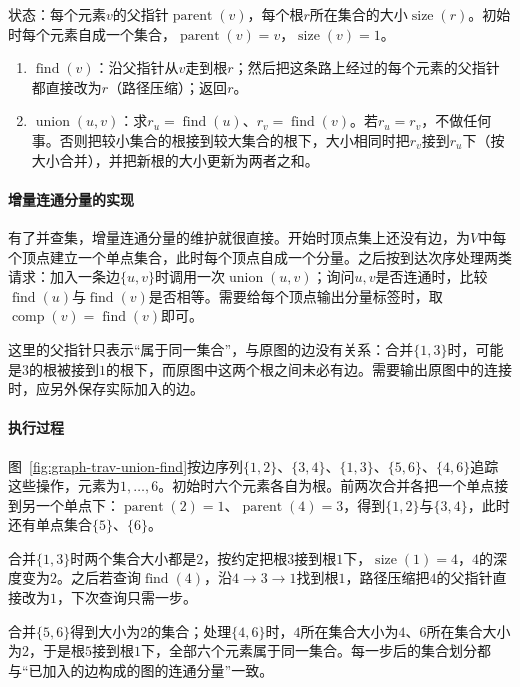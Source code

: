 \begin{algorithm}[并查集的两种操作]
\label{alg:graph-trav-union-find}
状态：每个元素$v$的父指针$\operatorname{parent}(v)$，每个根$r$所在集合的大小$\operatorname{size}(r)$。初始时每个元素自成一个集合，$\operatorname{parent}(v)=v$，$\operatorname{size}(v)=1$。
\begin{enumerate}
  \item $\operatorname{find}(v)$：沿父指针从$v$走到根$r$；然后把这条路上经过的每个元素的父指针都直接改为$r$（路径压缩）；返回$r$。
  \item $\operatorname{union}(u,v)$：求$r_u=\operatorname{find}(u)$、$r_v=\operatorname{find}(v)$。若$r_u=r_v$，不做任何事。否则把较小集合的根接到较大集合的根下，大小相同时把$r_v$接到$r_u$下（按大小合并），并把新根的大小更新为两者之和。
\end{enumerate}
\end{algorithm}

\paragraph{增量连通分量的实现}
有了并查集，增量连通分量的维护就很直接。开始时顶点集上还没有边，为$V$中每个顶点建立一个单点集合，此时每个顶点自成一个分量。之后按到达次序处理两类请求：加入一条边$\{u,v\}$时调用一次$\operatorname{union}(u,v)$；询问$u,v$是否连通时，比较$\operatorname{find}(u)$与$\operatorname{find}(v)$是否相等。需要给每个顶点输出分量标签时，取$\operatorname{comp}(v)=\operatorname{find}(v)$即可。

这里的父指针只表示“属于同一集合”，与原图的边没有关系：合并$\{1,3\}$时，可能是$3$的根被接到$1$的根下，而原图中这两个根之间未必有边。需要输出原图中的连接时，应另外保存实际加入的边。

\paragraph{执行过程}
图~\ref{fig:graph-trav-union-find}按边序列$\{1,2\}$、$\{3,4\}$、$\{1,3\}$、$\{5,6\}$、$\{4,6\}$追踪这些操作，元素为$1,\ldots,6$。初始时六个元素各自为根。前两次合并各把一个单点接到另一个单点下：$\operatorname{parent}(2)=1$、$\operatorname{parent}(4)=3$，得到$\{1,2\}$与$\{3,4\}$，此时还有单点集合$\{5\}$、$\{6\}$。

合并$\{1,3\}$时两个集合大小都是$2$，按约定把根$3$接到根$1$下，$\operatorname{size}(1)=4$，$4$的深度变为$2$。之后若查询$\operatorname{find}(4)$，沿$4\to3\to1$找到根$1$，路径压缩把$4$的父指针直接改为$1$，下次查询只需一步。

合并$\{5,6\}$得到大小为$2$的集合；处理$\{4,6\}$时，$4$所在集合大小为$4$、$6$所在集合大小为$2$，于是根$5$接到根$1$下，全部六个元素属于同一集合。每一步后的集合划分都与“已加入的边构成的图的连通分量”一致。

